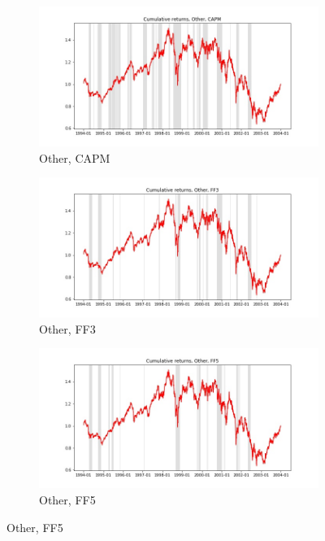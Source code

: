 \documentclass{article}
\begin{document}
 \begin{figure}
  \centering
  \begin{subfigure}[b]{0.3\textwidth}
    \centering
    \includegraphics[width=\textwidth]{Other/bwunif_full_cumrets_ofint_CAPM.jpg}
    \caption{Other, CAPM}
    \label{fig:1}
  \end{subfigure}
  \begin{subfigure}[b]{0.3\textwidth}
    \centering
    \includegraphics[width=\textwidth]{Other/bwunif_full_cumrets_ofint_FF3.jpg}
    \caption{Other, FF3}
    \label{fig:2}
  \end{subfigure}
    \begin{subfigure}[b]{0.3\textwidth}
    \centering
    \includegraphics[width=\textwidth]{Other/bwunif_full_cumrets_ofint_FF5.jpg}
    \caption{Other, FF5}
    \label{fig:1}
  \end{subfigure}
  \end{figure}
        
  
\end{document}
